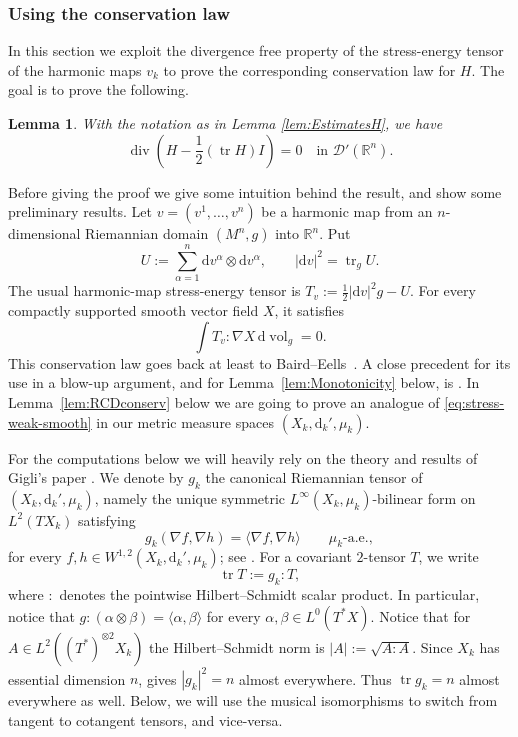 \documentclass[12pt,a4paper,reqno]{amsart}
\newtheorem{lemma}[theorem]{Lemma}
\newcommand{\R}{\mathbb R}
\DeclareMathOperator{\vol}{vol}
\newcommand{\tr}{\operatorname{tr}}
\begin{document}
\subsubsection{Using the conservation law}
In this section we exploit the divergence free property of the stress-energy tensor of the harmonic maps $v_k$ to prove the corresponding conservation law for $H$. The goal is to prove the following.
\begin{lemma}\label{lem:StressIdentity}
With the notation as in Lemma \ref{lem:EstimatesH}, we have
    \begin{equation}
 \operatorname{div}\left(H-\frac12(\operatorname{tr}H)I\right)=0
 \quad\text{in }\mathcal D'(\mathbb R^n).
 \label{eq:linear-gauge}
\end{equation}
\end{lemma}

Before giving the proof we give some intuition behind the result, and show some preliminary results. Let $v=(v^1,\ldots,v^n)$ be a harmonic map from an $n$-dimensional
Riemannian domain $(M^n,g)$ into $\R^n$.  Put
\[
 U:=\sum_{\alpha=1}^n \mathrm{d}v^\alpha\otimes \mathrm{d}v^\alpha,
 \qquad |\mathrm{d}v|^2=\tr_g U.
\]
The usual harmonic-map stress-energy tensor is
 $T_v:=\frac12|\mathrm{d}v|^2g-U$. 
For every compactly supported smooth vector field $X$, it satisfies
\begin{equation}\label{eq:stress-weak-smooth}
 \int T_v:\nabla X\,\mathrm{d}\vol_g=0.
\end{equation}
This conservation law goes back at least to
Baird--Eells~\cite[Theorem 2.9]{BairdEells}.  A close precedent for its
use in a blow-up argument, and for Lemma~\ref{lem:Monotonicity} below,
is \cite[\S1, (1.3), (1.5)--(1.7), and Lemma 1.6]{Lin1999}. In Lemma~\ref{lem:RCDconserv} below we are going to prove an analogue of \eqref{eq:stress-weak-smooth} in our metric measure spaces $(X_k,\mathrm{d}_k',\mu_k)$.
\smallskip


For the computations below we will heavily rely on the theory and results of Gigli's paper \cite{GigliNDG}. We denote by $g_k$ the canonical Riemannian tensor of
$(X_k,\mathrm{d}_k',\mu_k)$, namely the unique symmetric
$L^\infty(X_k,\mu_k)$-bilinear form on $L^2(TX_k)$ satisfying
\[
 g_k(\nabla f,\nabla h)
 =\langle\nabla f,\nabla h\rangle
 \qquad\mu_k\text{-a.e.},
\]
for every $f,h\in W^{1,2}(X_k,\mathrm{d}_k',\mu_k)$; see \cite[Proposition~3.2]{AHPT}. For a covariant $2$-tensor $T$,
we write
\[
 \tr T:=g_k:T,
\]
where $:$ denotes the pointwise Hilbert--Schmidt scalar product.
In particular, notice that
$
 g:(\alpha\otimes\beta)=\langle\alpha,\beta\rangle
$
for every $\alpha,\beta\in L^0(T^*X)$. Notice that for $A\in L^2((T^*)^{\otimes 2} X_k)$ the Hilbert--Schmidt norm is $|A|:=\sqrt{A:A}$. Since $X_k$ has essential
dimension $n$, \cite[Lemma~3.3]{AHPT} gives
$|g_k|^2=n$ almost everywhere. Thus $\tr g_k=n$ almost everywhere as well. Below, we will use the musical
isomorphisms to switch from tangent to cotangent tensors, and vice-versa.
\end{document}

